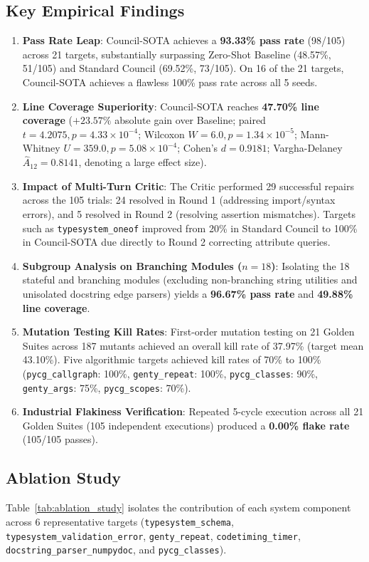 \documentclass[conference]{IEEEtran}
\begin{document}
\subsection{Key Empirical Findings}
\begin{enumerate}
    \item \textbf{Pass Rate Leap}: Council-SOTA achieves a \textbf{93.33\% pass rate} (98/105) across 21 targets, substantially surpassing Zero-Shot Baseline (48.57\%, 51/105) and Standard Council (69.52\%, 73/105). On 16 of the 21 targets, Council-SOTA achieves a flawless 100\% pass rate across all 5 seeds.
    \item \textbf{Line Coverage Superiority}: Council-SOTA reaches \textbf{47.70\% line coverage} ($+23.57\%$ absolute gain over Baseline; paired $t = 4.2075, p = 4.33 \times 10^{-4}$; Wilcoxon $W = 6.0, p = 1.34 \times 10^{-5}$; Mann-Whitney $U = 359.0, p = 5.08 \times 10^{-4}$; Cohen's $d = 0.9181$; Vargha-Delaney $\hat{A}_{12} = 0.8141$, denoting a large effect size).
    \item \textbf{Impact of Multi-Turn Critic}: The Critic performed 29 successful repairs across the 105 trials: 24 resolved in Round 1 (addressing import/syntax errors), and 5 resolved in Round 2 (resolving assertion mismatches). Targets such as \texttt{typesystem\_oneof} improved from 20\% in Standard Council to 100\% in Council-SOTA due directly to Round 2 correcting attribute queries.
    \item \textbf{Subgroup Analysis on Branching Modules ($n=18$)}: Isolating the 18 stateful and branching modules (excluding non-branching string utilities and unisolated docstring edge parsers) yields a \textbf{96.67\% pass rate} and \textbf{49.88\% line coverage}.
    \item \textbf{Mutation Testing Kill Rates}: First-order mutation testing on 21 Golden Suites across 187 mutants achieved an overall kill rate of 37.97\% (target mean 43.10\%). Five algorithmic targets achieved kill rates of 70\% to 100\% (\texttt{pycg\_callgraph}: 100\%, \texttt{genty\_repeat}: 100\%, \texttt{pycg\_classes}: 90\%, \texttt{genty\_args}: 75\%, \texttt{pycg\_scopes}: 70\%).
    \item \textbf{Industrial Flakiness Verification}: Repeated 5-cycle execution across all 21 Golden Suites (105 independent executions) produced a \textbf{0.00\% flake rate} (105/105 passes).
\end{enumerate}

\subsection{Ablation Study}
Table~\ref{tab:ablation_study} isolates the contribution of each system component across 6 representative targets (\texttt{typesystem\_schema}, \texttt{typesystem\_validation\_error}, \texttt{genty\_repeat}, \texttt{codetiming\_timer}, \texttt{docstring\_parser\_numpydoc}, and \texttt{pycg\_classes}).
\end{document}
